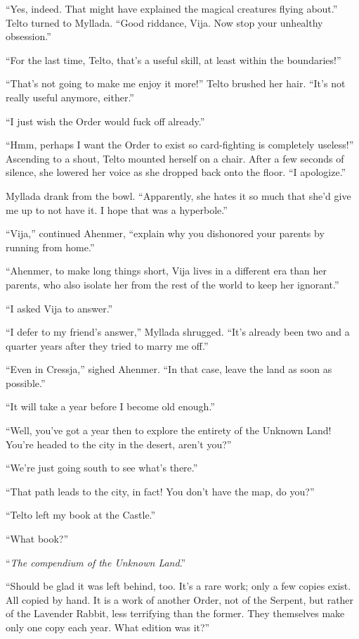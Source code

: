 ``Yes, indeed. That might have explained the magical creatures flying about.'' Telto turned to Myllada. ``Good riddance, Vija. Now stop your unhealthy obsession.''

``For the last time, Telto, that's a useful skill, at least within the boundaries!''

``That's not going to make me enjoy it more!'' Telto brushed her hair. ``It's not really useful anymore, either.''

``I just wish the Order would fuck off already.''

``Hmm, perhaps I want the Order to exist so card-fighting is completely useless!'' Ascending to a shout, Telto mounted herself on a chair. After a few seconds of silence, she lowered her voice as she dropped back onto the floor. ``I apologize.''

Myllada drank from the bowl. ``Apparently, she hates it so much that she'd give me up to not have it. I hope that was a hyperbole.''

``Vija,'' continued Ahenmer, ``explain why you dishonored your parents by running from home.''

``Ahenmer, to make long things short, Vija lives in a different era than her parents, who also isolate her from the rest of the world to keep her ignorant.''

``I asked Vija to answer.''

``I defer to my friend's answer,'' Myllada shrugged. ``It's already been two and a quarter years after they tried to marry me off.''

``Even in Cressja,'' sighed Ahenmer. ``In that case, leave the land as soon as possible.''

``It will take a year before I become old enough.''

``Well, you've got a year then to explore the entirety of the Unknown Land! You're headed to the city in the desert, aren't you?''

``We're just going south to see what's there.''

``That path leads to the city, in fact! You don't have the map, do you?''

``Telto left my book at the Castle.''

``What book?''

``\emph{The compendium of the Unknown Land}.''

``Should be glad it was left behind, too. It's a rare work; only a few copies exist. All copied by hand. It is a work of another Order, not of the Serpent, but rather of the Lavender Rabbit, less terrifying than the former. They themselves make only one copy each year. What edition was it?''

